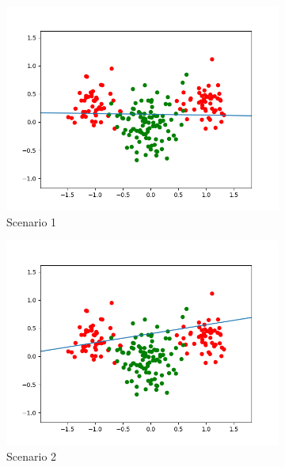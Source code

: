 \documentclass[a4paper]{article}
\begin{document}
\begin{figure}[htb]
    \centering
    \begin{subfigure}{0.4\textwidth}
        \includegraphics[width=\textwidth]{Labs/Lab 1/Lab 1a/Results/scenario1.png}
        \caption{Scenario 1}
        \label{fig:scenario-1}
    \end{subfigure}
    \hfill
    \begin{subfigure}{0.4\textwidth}
        \includegraphics[width=\textwidth]{Labs/Lab 1/Lab 1a/Results/scenario2.png}
        \caption{Scenario 2}
        \label{fig:scenario-2}
    \end{subfigure}
     \begin{subfigure}{0.4\textwidth}

\end{subfigure}
\end{figure}
\end{document}
